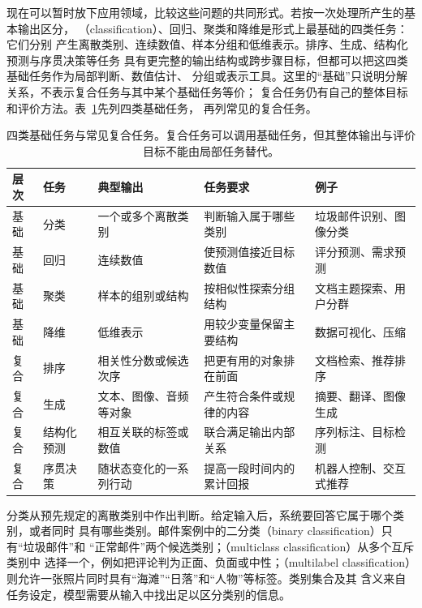 现在可以暂时放下应用领域，比较这些问题的共同形式。若按一次处理所产生的基本输出区分，
（classification）、回归、聚类和降维是形式上最基础的四类任务：它们分别
产生离散类别、连续数值、样本分组和低维表示。排序、生成、结构化预测与序贯决策等任务
具有更完整的输出结构或跨步骤目标，但都可以把这四类基础任务作为局部判断、数值估计、
分组或表示工具。这里的“基础”只说明分解关系，不表示复合任务与其中某个基础任务等价；
复合任务仍有自己的整体目标和评价方法。表~\ref{tab:common-ml-tasks}先列四类基础任务，
再列常见的复合任务。

\begin{table}[t]
  \centering
  \small
  \begin{tabularx}{\linewidth}{@{}llXXX@{}}
    \toprule
    \textbf{层次} & \textbf{任务} & \textbf{典型输出} & \textbf{任务要求} & \textbf{例子} \\
    \midrule
    基础 & 分类 & 一个或多个离散类别 & 判断输入属于哪些类别 & 垃圾邮件识别、图像分类 \\
    基础 & 回归 & 连续数值 & 使预测值接近目标数值 & 评分预测、需求预测 \\
    基础 & 聚类 & 样本的组别或结构 & 按相似性探索分组结构 & 文档主题探索、用户分群 \\
    基础 & 降维 & 低维表示 & 用较少变量保留主要结构 & 数据可视化、压缩 \\
    复合 & 排序 & 相关性分数或候选次序 & 把更有用的对象排在前面 & 文档检索、推荐排序 \\
    复合 & 生成 & 文本、图像、音频等对象 & 产生符合条件或规律的内容 & 摘要、翻译、图像生成 \\
    复合 & 结构化预测 & 相互关联的标签或数值 & 联合满足输出内部关系 & 序列标注、目标检测 \\
    复合 & 序贯决策 & 随状态变化的一系列行动 & 提高一段时间内的累计回报 & 机器人控制、交互式推荐 \\
    \bottomrule
  \end{tabularx}
  \caption{四类基础任务与常见复合任务。复合任务可以调用基础任务，但其整体输出与评价目标不能由局部任务替代。}
  \label{tab:common-ml-tasks}
\end{table}

分类从预先规定的离散类别中作出判断。给定输入后，系统要回答它属于哪个类别，或者同时
具有哪些类别。邮件案例中的二分类（binary classification）只有“垃圾邮件”和
“正常邮件”两个候选类别；（multiclass classification）从多个互斥类别中
选择一个，例如把评论判为正面、负面或中性；（multilabel
classification）则允许一张照片同时具有“海滩”“日落”和“人物”等标签。类别集合及其
含义来自任务设定，模型需要从输入中找出足以区分类别的信息。

